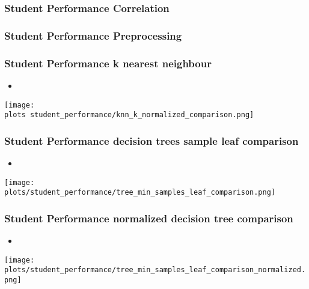 \documentclass[aspectratio=169]{beamer}
\def \plots {./plots/}
\begin{document}
\begin{frame}{}
\frametitle{Student Performance Correlation}
\end{frame}

\begin{frame}{}
\frametitle{Student Performance Preprocessing}
\end{frame}

\begin{frame}{}
\frametitle{Student Performance k nearest neighbour}
\begin{minipage}{0.30\textwidth}
\begin{itemize}
\item  %
\end{itemize}
\end{minipage}
\begin{minipage}{0.69\textwidth}
    \texttt{[image: \\plots student\_performance/knn\_k\_normalized\_comparison.png]}
\end{minipage}
\end{frame}

\begin{frame}{}
\frametitle{Student Performance decision trees sample leaf comparison}
\begin{minipage}{0.30\textwidth}
\begin{itemize}
\item  %
\end{itemize}
\end{minipage}
\begin{minipage}{0.69\textwidth}
    \texttt{[image: plots/student\_performance/tree\_min\_samples\_leaf\_comparison.png]}
\end{minipage}
\end{frame}


\begin{frame}{}
\frametitle{Student Performance normalized decision tree comparison}
\begin{minipage}{0.30\textwidth}
\begin{itemize}
\item  %
\end{itemize}
\end{minipage}
\begin{minipage}{0.69\textwidth}
    \texttt{[image: plots/student\_performance/tree\_min\_samples\_leaf\_comparison\_normalized.png]}
\end{minipage}
\end{frame}
\end{document}
